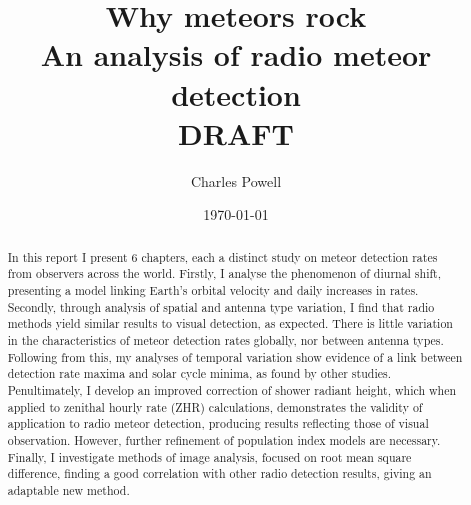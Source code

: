 \documentclass[a4paper,10pt,notitlepage, twocolumn]{report}
\title{\huge Why meteors rock \\ \large An analysis of radio meteor detection \\ \vspace{1em} \huge {\bf DRAFT}}
\author{Charles Powell}
\begin{document}
	

\begin{titlingpage}
\date{\today}
\maketitle

\vspace{10em}
\begin{abstract}
	In this report I present 6 chapters, each a distinct study on meteor detection rates from observers across the world. Firstly, I analyse the phenomenon of diurnal shift, presenting a model linking Earth's orbital velocity and daily increases in rates. Secondly, through analysis of spatial and antenna type variation, I find that radio methods yield similar results to visual detection, as expected. There is little variation in the characteristics of meteor detection rates globally, nor between antenna types. Following from this, my analyses of temporal variation show evidence of a link between detection rate maxima and solar cycle minima, as found by other studies. Penultimately, I develop an improved correction of shower radiant height, which when applied to zenithal hourly rate (ZHR) calculations, demonstrates the validity of application to radio meteor detection, producing results reflecting those of visual observation. However, further refinement of population index models are necessary. Finally, I investigate methods of image analysis, focused on root mean square difference, finding a good correlation with other radio detection results, giving an adaptable new method.
\end{abstract}
\end{titlingpage}

\tableofcontents


%
%
%
%
%
%


\onecolumn
\begin{appendices}

\end{appendices}
\printbibliography
\end{document}
